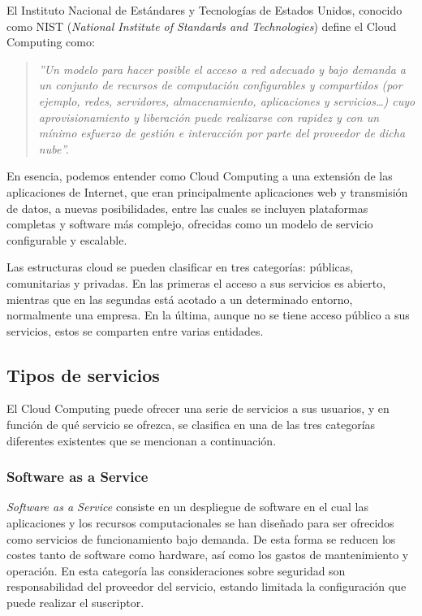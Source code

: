 El Instituto Nacional de Estándares y Tecnologías de Estados Unidos, conocido como NIST (\textit{National Institute of Standards and Technologies}) define el Cloud Computing como:

\begin{quotation}
\textit{''Un modelo para hacer posible el acceso a red adecuado y bajo demanda a un conjunto de recursos de computación configurables y compartidos (por ejemplo, redes, servidores, almacenamiento, aplicaciones y servicios…) cuyo aprovisionamiento y liberación puede realizarse con rapidez y con un mínimo esfuerzo de gestión e interacción por parte del proveedor de dicha nube''.} \cite{inteco-cloud}
\end{quotation}

En esencia, podemos entender como Cloud Computing a una extensión de las aplicaciones de Internet, que eran principalmente aplicaciones web y transmisión de datos, a nuevas posibilidades, entre las cuales se incluyen plataformas completas y software más complejo, ofrecidas como un modelo de servicio configurable y escalable.

Las estructuras cloud se pueden clasificar en tres categorías: públicas, comunitarias y privadas. En las primeras el acceso a sus servicios es abierto, mientras que en las segundas está acotado a un determinado entorno, normalmente una empresa. En la última, aunque no se tiene acceso público a sus servicios, estos se comparten entre varias entidades.

\subsection{Tipos de servicios}

El Cloud Computing puede ofrecer una serie de servicios a sus usuarios, y en función de qué servicio se ofrezca, se clasifica en una de las tres categorías diferentes existentes que se mencionan a continuación.

\subsubsection{Software as a Service}

\emph{Software as a Service} consiste en un despliegue de software en el cual las aplicaciones y los recursos computacionales se han diseñado para ser ofrecidos como servicios de funcionamiento bajo demanda. De esta forma se reducen los costes tanto de software como hardware, así como los gastos de mantenimiento y operación. En esta categoría las consideraciones sobre seguridad son responsabilidad del proveedor del servicio, estando limitada la configuración que puede realizar el suscriptor.

